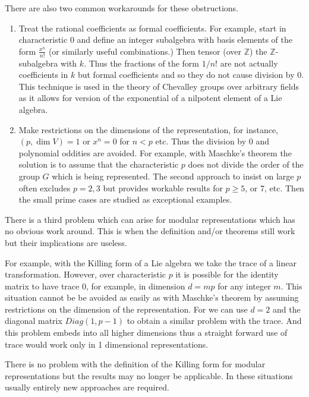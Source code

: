 \documentclass[12pt]{article}
\begin{document}
There are also two common workarounds for these obstructions.
\begin{enumerate}
\item Treat the rational coefficients as formal coefficients.  For example, 
start in characteristic 0 and define an integer subalgebra with basis elements of the form $\frac{x^n}{n!}$ (or similarly useful combinations.)  Then tensor (over $\mathbb{Z}$) the $\mathbb{Z}$-subalgebra with $k$.  Thus the fractions 
of the form $1/n!$ are not actually coefficients in $k$ but formal coefficients and so they do not cause division by 0.  This technique is used in the theory 
of Chevalley groups over arbitrary fields as it allows for version of the
exponential of a nilpotent element of a Lie algebra.
\item Make restrictions on the dimensions of the representation, for instance,
$(p,\dim V)=1$ or $x^n=0$ for $n<p$ etc.  Thus the division by 0 and polynomial oddities are avoided.  For example, with Maschke's theorem the solution is to
assume that the characteristic $p$ does not divide the order of the group $G$
which is being represented.  The second approach to insist on large $p$ often
excludes $p=2,3$ but provides workable results for $p\geq 5$, or 7, etc.  Then the small prime cases are studied as exceptional examples.
\end{enumerate}

There is a third problem which can arise for modular representations which has no obvious work around.  This is when the definition and/or theorems still work but their implications are useless.  

For example, with the Killing form of a Lie algebra we take the trace of a linear transformation.  However, over characteristic $p$ it is possible for the identity matrix to have trace 0, for example, in dimension $d=mp$ for any integer $m$.   This situation cannot be be avoided as easily as with Maschke's theorem by assuming restrictions on the dimension of the representation.  For we can use $d=2$ and the diagonal matrix $Diag(1,p-1)$ to obtain a similar problem with the trace.  And this problem embeds into all higher dimensions thus a straight forward use of trace would work only in 1 dimensional representations.

There is no problem with the definition of the Killing form for modular representations but the results may no longer be applicable.  In these situations usually entirely new approaches are required.
\end{document}
